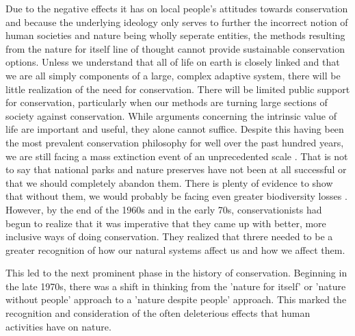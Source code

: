 \documentclass[rutwik_proposal.tex]{subfiles}
\begin{document}
Due to the negative effects it has on local people's attitudes towards conservation and because the underlying ideology only serves to further the incorrect notion of human societies and nature being wholly seperate entities, the methods resulting from the nature for itself line of thought cannot provide sustainable conservation options. Unless we understand that all of life on earth is closely linked and that we are all simply components of a large, complex adaptive system, there will be little realization of the need for conservation. There will be limited public support for conservation, particularly when our methods are turning large sections of society against conservation. While arguments concerning the intrinsic value of life are important and useful, they alone cannot suffice. Despite this having been the most prevalent conservation philosophy for well over the past hundred years, we are still facing a mass extinction event of an unprecedented scale \cite{Stuart04, Barnosky11, Dirzo14}. That is not to say that national parks and nature preserves have not been at all successful or that we should completely abandon them. There is plenty of evidence to show that without them, we would probably be facing even greater biodiversity losses \cite{Rodrigues06, Hoffman11, Hoffman10, Chape05}. However, by the end of the 1960s and in the early 70s, conservationists had begun to realize that it was imperative that they came up with better, more inclusive ways of doing conservation. They realized that threre needed to be a greater recognition of how our natural systems affect us and how we affect them.

This led to the next prominent phase in the history of conservation. Beginning in the late 1970s, there was a shift in thinking from the 'nature for itself' or 'nature without people' approach to a 'nature despite people' approach. This marked the recognition and consideration of the often deleterious effects that human activities have on nature.
\end{document}
